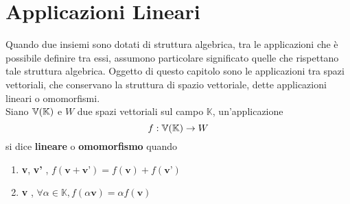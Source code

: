 \documentclass[../main.tex]{subfiles}
\begin{document}
\section{Applicazioni Lineari}
Quando due insiemi sono dotati di struttura algebrica, tra le applicazioni che
è possibile definire tra essi, assumono particolare significato quelle che
rispettano tale struttura algebrica. Oggetto di questo capitolo sono le
applicazioni tra spazi vettoriali, che conservano la struttura di spazio
vettoriale, dette applicazioni lineari o omomorfismi.\\ Siano $\mathbb{V} (\mathbb{K})$ e $W$ due
spazi vettoriali sul campo $\mathbb{K}$, un'applicazione
\[
    f: \mathbb{V} (\mathbb{K}) \rightarrow W
\]
si dice \textbf{lineare} o \textbf{omomorfismo} quando
\begin{enumerate}
    \item \forall \textbf{v}, \textbf{v'} \in \V, $f(\textbf{v}+\textbf{v'}) = f(\textbf{v})+f(\textbf{v'})$
    \item \forall \textbf{v} \in \V, $\forall \alpha \in \mathbb{K}, f(\alpha\textbf{v}) = \alpha f(\textbf{v})$
\end{enumerate}
\end{document}
